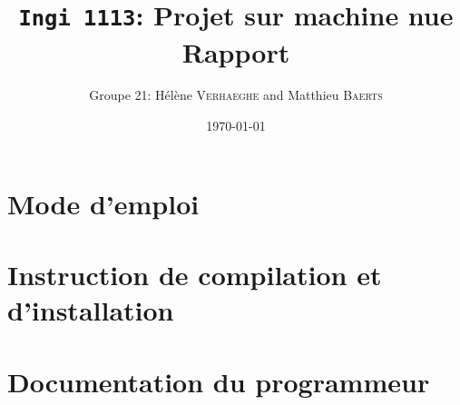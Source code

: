 \documentclass[a4paper,11pt]{article}
\title{\texttt{Ingi 1113}: Projet sur machine nue \\ Rapport}
\author{Groupe 21: Hélène \textsc{Verhaeghe} and Matthieu \textsc{Baerts}}
\date{\today}
\begin{document}

\maketitle


\section{Mode d'emploi}


\section{Instruction de compilation et d'installation}


\section{Documentation du programmeur}

\end{document}
